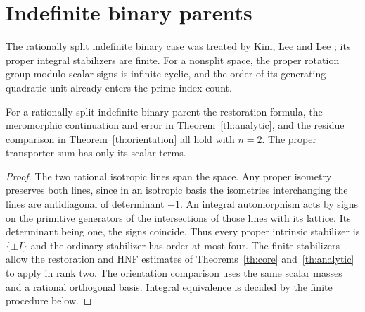 \section{Indefinite binary parents}\label{sec:realbinary}
The rationally split indefinite binary case was treated by Kim,
Lee and Lee \cite{Hyperbolic}; its proper integral stabilizers are
finite. For a nonsplit space, the proper rotation group modulo
scalar signs is infinite cyclic, and the order of its generating
quadratic unit already enters the prime-index count.

\begin{proposition}\label{prop:splitbinary}
For a rationally split indefinite binary parent the restoration formula, the meromorphic continuation and error in Theorem~\ref{th:analytic}, and the residue comparison in Theorem~\ref{th:orientation} all hold with \(n=2\). The proper transporter sum has only its scalar terms.
\end{proposition}
\begin{proof}
The two rational isotropic lines span the space. Any proper isometry preserves both lines, since in an isotropic basis the isometries interchanging the lines are antidiagonal of determinant \(-1\). An integral automorphism acts by signs on the primitive generators of the intersections of those lines with its lattice. Its determinant being one, the signs coincide. Thus every proper intrinsic stabilizer is \(\{\pm I\}\) and the ordinary stabilizer has order at most four. The finite stabilizers allow the restoration and HNF estimates of Theorems~\ref{th:core} and~\ref{th:analytic} to apply in rank two. The orientation comparison uses the same scalar masses and a rational orthogonal basis. Integral equivalence is decided by the finite procedure below.
\end{proof}

